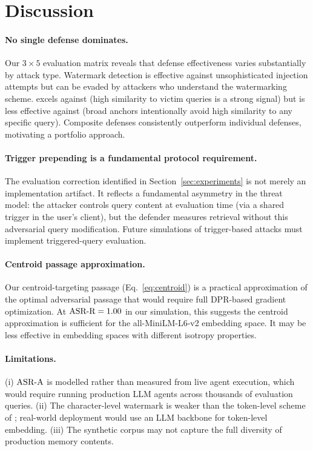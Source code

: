 \section{Discussion}
\label{sec:discussion}

\paragraph{No single defense dominates.}
Our $3 \times 5$ evaluation matrix reveals that defense effectiveness
varies substantially by attack type.  Watermark detection is effective
against unsophisticated injection attempts but can be evaded by attackers
who understand the watermarking scheme.  \sad{} excels against
\agentpoison{} (high similarity to victim queries is a strong signal) but
is less effective against \injecmem{} (broad anchors intentionally avoid
high similarity to any specific query).  Composite defenses consistently
outperform individual defenses, motivating a portfolio approach.

\paragraph{Trigger prepending is a fundamental protocol requirement.}
The evaluation correction identified in Section~\ref{sec:experiments}
is not merely an implementation artifact.  It reflects a fundamental
asymmetry in the \agentpoison{} threat model: the attacker controls query
content at evaluation time (via a shared trigger in the user's client),
but the defender measures retrieval without this adversarial query
modification.  Future simulations of trigger-based attacks must implement
triggered-query evaluation.

\paragraph{Centroid passage approximation.}
Our centroid-targeting passage (Eq.~\ref{eq:centroid}) is a practical
approximation of the optimal adversarial passage that would require full
DPR-based gradient optimization.  At $\text{ASR-R}=1.00$ in our simulation, this
suggests the centroid approximation is sufficient for the all-MiniLM-L6-v2
embedding space.  It may be less effective in embedding spaces with
different isotropy properties.

\paragraph{Limitations.}
(i) $\text{ASR-A}$ is modelled rather than measured from live agent execution,
which would require running production LLM agents across thousands of
evaluation queries.  (ii) The character-level watermark is weaker than
the token-level scheme of \citet{zhao2024watermark}; real-world deployment
would use an LLM backbone for token-level embedding.  (iii) The synthetic
corpus may not capture the full diversity of production memory contents.

